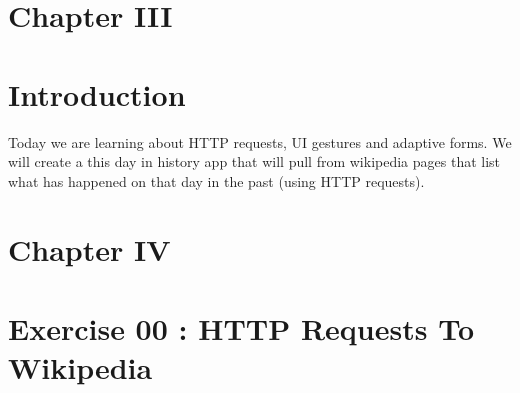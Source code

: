 \documentclass[12pt]{report}
\begin{document}
\vspace{\baselineskip}

\vspace{\baselineskip}



\newpage

\vspace{\baselineskip}
\vspace{\baselineskip}
\section*{Chapter III}
\section*{Introduction}

\vspace{\baselineskip}
Today we are learning about HTTP requests, UI gestures and adaptive forms. We will create a this day in history app that will pull from wikipedia pages that list what has happened on that day in the past (using HTTP requests). \par


\vspace{\baselineskip}

\vspace{\baselineskip}

\vspace{\baselineskip}



\newpage

\vspace{\baselineskip}
\vspace{\baselineskip}
\section*{Chapter IV}
\section*{Exercise 00 : HTTP Requests To Wikipedia}

\vspace{\baselineskip}

\vspace{\baselineskip}
\end{document}
